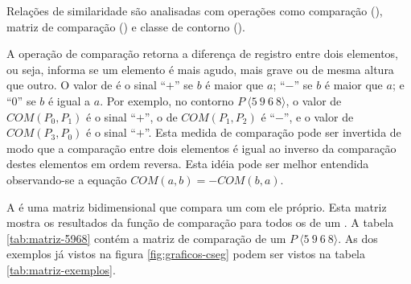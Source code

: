 Relações de similaridade \cite{marvin.ea87:relating} são analisadas
com operações como comparação (), matriz de comparação
() e classe de contorno ().

A operação de comparação  retorna a diferença de
registro entre dois elementos, ou seja, informa se um elemento é mais
agudo, mais grave ou de mesma altura que outro. O valor de 
é o sinal ``$+$'' se $b$ é maior que $a$; ``$-$'' se $b$ é maior que
$a$; e ``$0$'' se $b$ é igual a $a$. Por exemplo, no contorno
$P\:\langle5\:9\:6\:8\rangle$, o valor de $COM(P_0,P_1)$ é o sinal
``$+$'', o de $COM(P_1,P_2)$ é ``$-$'', e o valor de $COM(P_3,P_0)$ é
o sinal ``$+$''. Esta medida de comparação pode ser invertida de modo
que a comparação entre dois elementos é igual ao inverso da comparação
destes elementos em ordem reversa. Esta idéia pode ser melhor
entendida observando-se a equação $COM(a,b)=-COM(b,a)$.

A  é uma matriz bidimensional que compara um
 com ele próprio. Esta matriz mostra os resultados da
função de comparação  para todos os  de um
. A tabela \ref{tab:matriz-5968} contém a matriz de
comparação de um  $P\:\langle5\:9\:6\:8\rangle$. As
 dos exemplos já vistos na figura
\ref{fig:graficos-cseg} podem ser vistos na tabela
\ref{tab:matriz-exemplos}.

